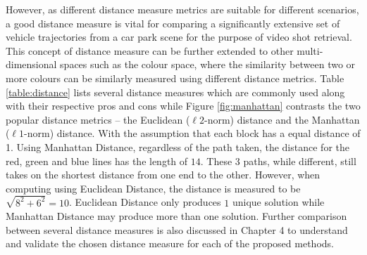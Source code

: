 However, as different distance measure metrics are suitable for different
scenarios, a good distance measure is vital for comparing a significantly
extensive set of vehicle trajectories from a car park scene for the purpose of video shot retrieval. This concept of distance measure can be further extended to other
multi-dimensional spaces such as the colour space, where the similarity between
two or more colours can be similarly measured using different distance metrics. 
Table \ref{table:distance} lists several
distance measures which are commonly used along with their respective pros and cons while Figure \ref{fig:manhattan} contrasts the two popular distance metrics -- the Euclidean ($\ell 2$-norm) distance and the Manhattan ($\ell 1$-norm) distance. 
With the assumption that each block has a equal distance of 1. Using Manhattan Distance, regardless of the path taken, the distance for the red, green and  blue lines has the length of $14$. These 3 paths, while different, still takes on the shortest distance from one end to the other. However, when computing using Euclidean Distance, the distance is measured to be $\sqrt{8^2 + 6^2} = 10$. Euclidean Distance only produces $1$ unique solution while Manhattan Distance may produce more than one solution.
Further comparison between several distance measures is
also discussed in Chapter 4 to understand and validate the chosen distance
measure for each of the proposed methods.


